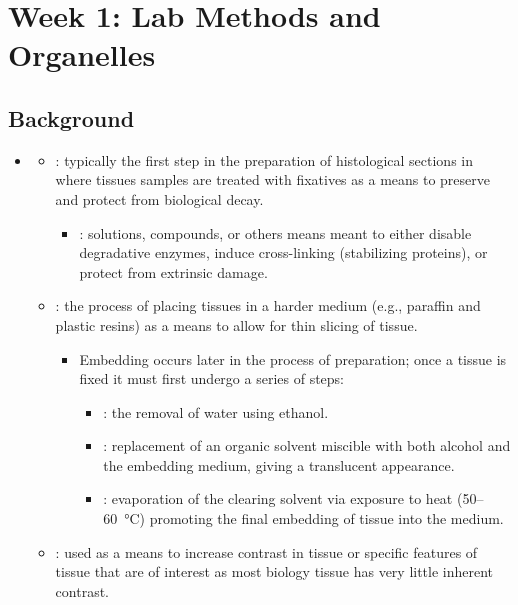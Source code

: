 \chapter{Week 1: Lab Methods and Organelles}\label{Week 1: Lab Methods and Organelles}

\section{Background}\label{Background}
\begin{itemize}
  \item {}
    \begin{itemize}
      \item {}: typically the first step in the preparation of histological sections in where tissues samples are treated with fixatives as a means to preserve and protect from biological decay.
        \begin{itemize}
          \item {}: solutions, compounds, or others means meant to either disable degradative enzymes, induce cross-linking (stabilizing proteins), or protect from extrinsic damage.
        \end{itemize}
      \item {}: the process of placing tissues in a harder medium (e.g., paraffin and plastic resins) as a means to allow for thin slicing of tissue.
        \begin{itemize}
          \item Embedding occurs later in the process of preparation; once a tissue is fixed it must first undergo a series of steps:
          \begin{itemize}
            \item {}: the removal of water using ethanol.
            \item {}: replacement of an organic solvent miscible with both alcohol and the embedding medium, giving a translucent appearance.
            \item {}: evaporation of the clearing solvent via exposure to heat (50--\SI{60}{\celsius}) promoting the final embedding of tissue into the medium.
          \end{itemize}
        \end{itemize}
      \item {}: used as a means to increase contrast in tissue or specific features of tissue that are of interest as most biology tissue has very little inherent contrast.

\end{itemize}
\end{itemize}
